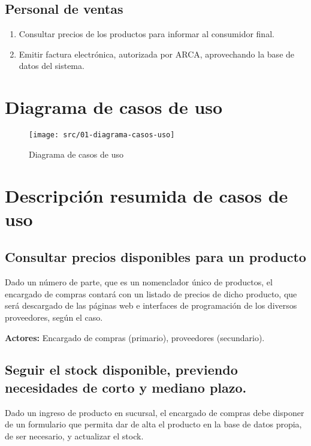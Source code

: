 \documentclass[11pt]{article}
\begin{document}
\subsection*{Personal de ventas}
\begin{enumerate}
	\item Consultar precios de los productos para informar al consumidor final.
	\item Emitir factura electrónica,
	autorizada por ARCA, aprovechando la base de datos del sistema.
\end{enumerate}

\section{Diagrama de casos de uso}

\begin{figure}[ht]
	\vspace{20pt}
	\centering
	\vspace{15pt}
	\texttt{[image: src/01-diagrama-casos-uso]}
	\caption{Diagrama de casos de uso}
	\vspace{15pt}
\end{figure}

\pagebreak

\section{Descripción resumida de casos de uso}

\subsection{Consultar precios disponibles para un producto}

Dado un número de parte,
que es un nomenclador único de productos,
el encargado de compras contará con un listado de precios de dicho producto,
que será descargado de las páginas web e interfaces de programación de los diversos proveedores,
según el caso.

\textbf{Actores:} Encargado de compras (primario), proveedores (secundario).

\subsection{Seguir el stock disponible, previendo necesidades de corto y mediano plazo.}

Dado un ingreso de producto en sucursal,
el encargado de compras debe disponer de un formulario que permita dar de alta el producto en la base de datos propia,
de ser necesario,
y actualizar el stock.
\end{document}
